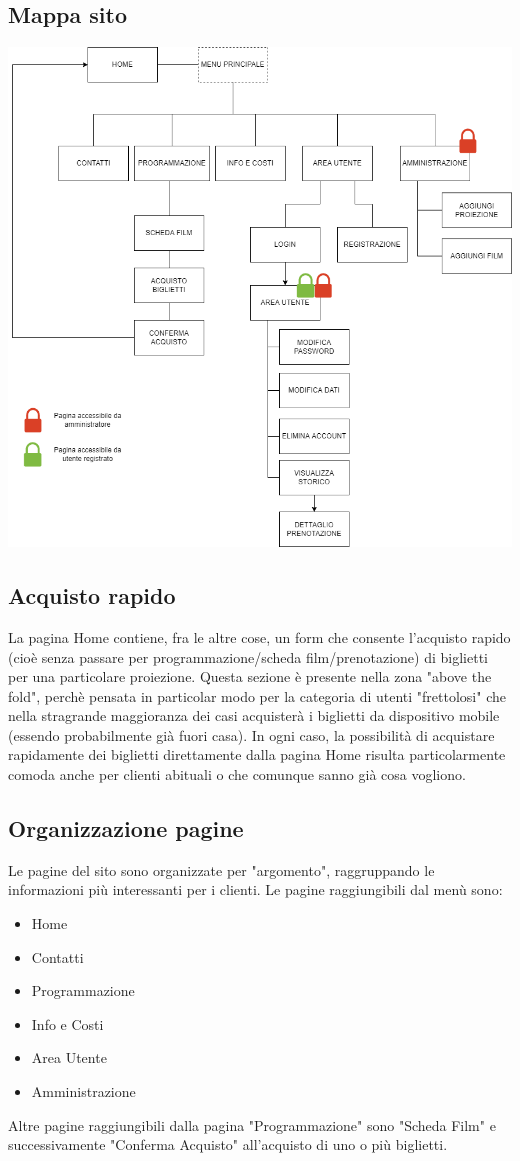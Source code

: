 \documentclass[a4paper, 12pt]{article}
\begin{document}
\subsection{Mappa sito}
\begin{center}
    \includegraphics[scale=0.5]{mappasito}
\end{center}

\subsection{Acquisto rapido}
La pagina Home contiene, fra le altre cose, un form che consente l'acquisto rapido (cioè senza passare per programmazione/scheda film/prenotazione) di biglietti per una particolare proiezione. Questa sezione è presente nella zona "above the fold", perchè pensata in particolar modo per la categoria di utenti "frettolosi" che nella stragrande maggioranza dei casi acquisterà i biglietti da dispositivo mobile (essendo probabilmente già fuori casa). In ogni caso, la possibilità di acquistare rapidamente dei biglietti direttamente dalla pagina Home risulta particolarmente comoda anche per clienti abituali o che comunque sanno già cosa vogliono.
\subsection{Organizzazione pagine}
Le pagine del sito sono organizzate per "argomento", raggruppando le informazioni più interessanti per i clienti.
Le pagine raggiungibili dal menù sono:
\begin{itemize}
    \item Home
    \item Contatti
    \item Programmazione
    \item Info e Costi
    \item Area Utente
    \item Amministrazione
\end{itemize}
Altre pagine raggiungibili dalla pagina "Programmazione" sono "Scheda Film" e successivamente "Conferma Acquisto" all'acquisto di uno o più biglietti.
\end{document}
